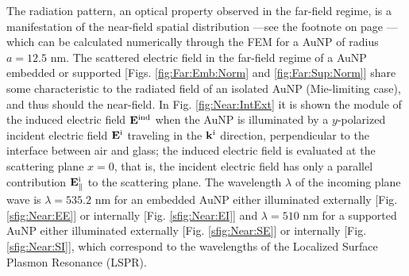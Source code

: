 The radiation pattern, an optical property observed in the far-field regime, is a manifestation of the near-field spatial distribution ---see the footnote on page \pageref{fnote:Stratton:Chu}--- which can be calculated numerically through the FEM for a AuNP of radius $a = 12.5$ nm. The scattered electric field in the  far-field regime of a AuNP embedded or supported  [Figs. \ref{fig:Far:Emb:Norm} and \ref{fig:Far:Sup:Norm}] share some characteristic to the radiated field of an isolated AuNP (Mie-limiting case), and thus should the near-field. In Fig. \ref{fig:Near:IntExt} it is shown the module of the induced electric field $\vb{E}^\text{ind}$ when the AuNP is illuminated by a $y$-polarized incident electric field $\vb{E}^\text{i}$ traveling in the $\vb{k}^\text{i}$ direction, perpendicular to the interface between air and glass; the induced electric field is evaluated at the scattering plane $x = 0$, that is, the incident electric field has only a parallel contribution $\vb{E}^\text{i}_\parallel$ to the scattering plane. The wavelength $\lambda$ of the incoming plane wave is $\lambda =535.2$ nm for an embedded AuNP either illuminated externally [Fig.  \ref{sfig:Near:EE}] or internally  [Fig.  \ref{sfig:Near:EI}] and  $\lambda =510$ nm for a supported AuNP either illuminated externally [Fig.  \ref{sfig:Near:SE}] or internally  [Fig.  \ref{sfig:Near:SI}], which correspond to the wavelengths of the Localized Surface Plasmon Resonance (LSPR).

